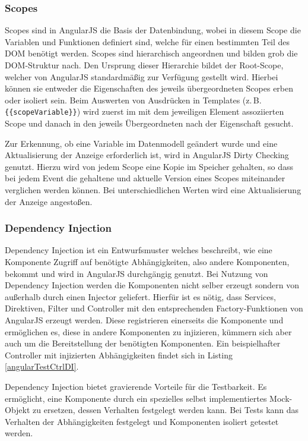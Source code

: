 \subsubsection{Scopes}
\label{sec:scopes}
Scopes sind in AngularJS die Basis der Datenbindung, wobei in diesem Scope die Variablen und Funktionen definiert sind, welche für einen bestimmten Teil des DOM benötigt werden. Scopes sind hierarchisch angeordnen und bilden grob die DOM-Struktur nach. Den Ursprung dieser Hierarchie bildet der Root-Scope, welcher von AngularJS standardmäßig zur Verfügung gestellt wird. Hierbei können sie entweder die Eigenschaften des jeweils übergeordneten Scopes erben oder isoliert sein. Beim Auswerten von Ausdrücken in Templates (z.\,B. \texttt{\{\{scopeVariable\}\}}) wird zuerst im mit dem jeweiligen Element assoziierten Scope und danach in den jeweils Übergeordneten nach der Eigenschaft gesucht.\cites[23\psqq]{angular-boehm}[]{angular-scopes}

Zur Erkennung, ob eine Variable im Datenmodell geändert wurde und eine Aktualisierung der Anzeige erforderlich ist, wird in AngularJS Dirty Checking genutzt. Hierzu wird von jedem Scope eine Kopie im Speicher gehalten, so dass bei jedem Event die gehaltene und aktuelle Version eines Scopes miteinander verglichen werden können. Bei unterschiedlichen Werten wird eine Aktualisierung der Anzeige angestoßen.\cites[24]{angular-boehm}[]{angular-dirty}

\subsubsection{Dependency Injection}
Dependency Injection ist ein Entwurfsmuster welches beschreibt, wie eine Komponente Zugriff auf benötigte Abhängigkeiten, also andere Komponenten, bekommt und wird in AngularJS durchgängig genutzt. Bei Nutzung von Dependency Injection werden die Komponenten nicht selber erzeugt sondern von außerhalb durch einen Injector geliefert. Hierfür ist es nötig, dass Services, Direktiven, Filter und Controller mit den entsprechenden Factory-Funktionen von AngularJS erzeugt werden. Diese registrieren einerseits die Komponente und ermöglichen es, diese in andere Komponenten zu injizieren, kümmern sich aber auch um die Bereitstellung der benötigten Komponenten. Ein beispielhafter Controller mit injizierten Abhängigkeiten findet sich in Listing \ref{angularTestCtrlDI}.\cite{angular-di}

\begin{figure}
	
\end{figure}

Dependency Injection bietet gravierende Vorteile für die Testbarkeit. Es ermöglicht, eine Komponente durch ein spezielles selbst implementiertes Mock-Objekt zu ersetzen, dessen Verhalten festgelegt werden kann. Bei Tests kann das Verhalten der Abhängigkeiten festgelegt und Komponenten isoliert getestet werden.\cite[][27]{angular-boehm}